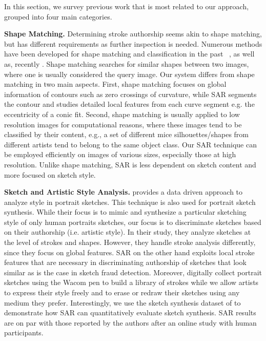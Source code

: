 In this section, we survey previous work that is most related to our approach, grouped into four main categories.

\noindent\textbf{Shape Matching.} \label{subsec: shapematching}
Determining stroke authorship seems akin to shape matching, but has different requirements as further inspection is needed. Numerous methods have been developed for shape matching and classification in the past ~\cite{mokhtarian1992theory,belongie2001matching,jin2003image,berg2005shape}, as well as, recently \cite{Michel:2011:SID:1994006.1994152,ion-cviu-11}. Shape matching searches for similar shapes between two images, where one is usually considered the query image. Our system differs from shape matching in two main aspects. First, shape matching focuses on global information of contours such as zero crossings of curvature, while SAR segments the contour and studies detailed local features from each curve segment e.g. the eccentricity of a conic fit. Second, shape matching is usually applied to low resolution images for computational reasons, where these images tend to be classified by their content, e.g., a set of different mice silhouettes/shapes from different artists tend to belong to the same object class. Our SAR technique can be employed efficiently on images of various sizes, especially those at high resolution. Unlike shape matching, SAR is less dependent on sketch content and more focused on sketch style. %

\noindent\textbf{Sketch and Artistic Style Analysis.}\label{subsec: artisticanalysis}
\cite{Berger:2013:SAP:2461912.2461964} provides a data driven approach to analyze style in portrait sketches. This technique is also used for portrait sketch synthesis. While their focus is to mimic and synthesize a particular sketching style of only human portraits sketches, our focus is to discriminate sketches based on their authorship (i.e. artistic style). In their study, they analyze sketches at the level of strokes and shapes. However, they handle stroke analysis differently, since they focus on global features. SAR on the other hand exploits local stroke features that are necessary in discriminating authorship of sketches that look similar as is the case in sketch fraud detection. Moreover, \cite{Berger:2013:SAP:2461912.2461964} digitally collect portrait sketches using the Wacom pen to build a library of strokes while we allow artists to express their style freely and to erase or redraw their sketches using any medium they prefer. Interestingly, we use the sketch synthesis dataset of \cite{Berger:2013:SAP:2461912.2461964} to demonstrate how SAR can quantitatively evaluate sketch synthesis. SAR results are on par with those reported by the authors after an online study with human participants.

